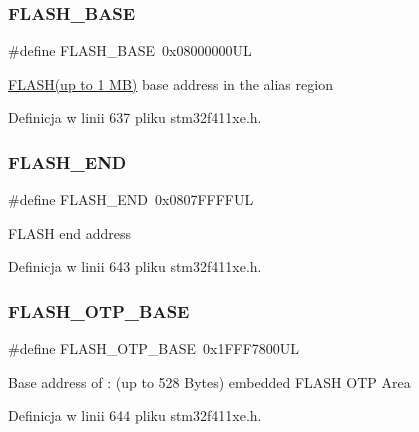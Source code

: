 \subsubsection{\texorpdfstring{F\+L\+A\+S\+H\+\_\+\+B\+A\+SE}{FLASH\_BASE}}
{\footnotesize\ttfamily \#define F\+L\+A\+S\+H\+\_\+\+B\+A\+SE~0x08000000\+UL}

\hyperlink{group___peripheral__declaration_ga844ea28ba1e0a5a0e497f16b61ea306b}{F\+L\+A\+S\+H(up to 1 M\+B)} base address in the alias region 

Definicja w linii 637 pliku stm32f411xe.\+h.

\mbox{\label{group___peripheral__memory__map_ga8be554f354e5aa65370f6db63d4f3ee4}} 
\subsubsection{\texorpdfstring{F\+L\+A\+S\+H\+\_\+\+E\+ND}{FLASH\_END}}
{\footnotesize\ttfamily \#define F\+L\+A\+S\+H\+\_\+\+E\+ND~0x0807\+F\+F\+F\+F\+UL}

F\+L\+A\+SH end address 

Definicja w linii 643 pliku stm32f411xe.\+h.

\mbox{\label{group___peripheral__memory__map_ga91d296a67aec0da8f31c368cbc0eea94}} 
\subsubsection{\texorpdfstring{F\+L\+A\+S\+H\+\_\+\+O\+T\+P\+\_\+\+B\+A\+SE}{FLASH\_OTP\_BASE}}
{\footnotesize\ttfamily \#define F\+L\+A\+S\+H\+\_\+\+O\+T\+P\+\_\+\+B\+A\+SE~0x1\+F\+F\+F7800\+UL}

Base address of \+: (up to 528 Bytes) embedded F\+L\+A\+SH O\+TP Area 

Definicja w linii 644 pliku stm32f411xe.\+h.

